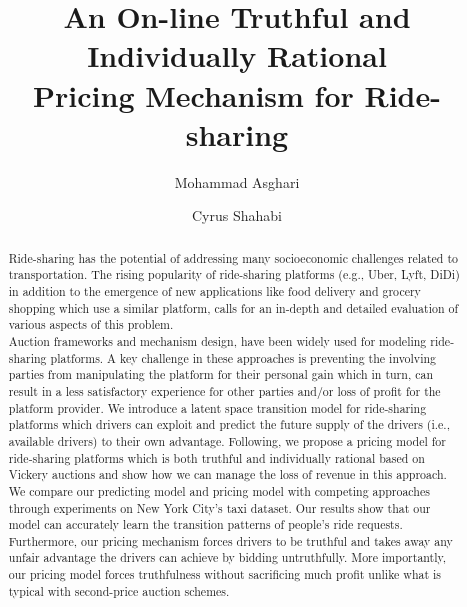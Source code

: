 \documentclass[sigconf]{acmart}
\begin{document}
\title{An On-line Truthful and Individually Rational\\Pricing Mechanism for Ride-sharing}
\author{Mohammad Asghari}
\author{Cyrus Shahabi}

\begin{abstract}
Ride-sharing has the potential of addressing many socioeconomic challenges related to transportation. The rising popularity of ride-sharing platforms (e.g., Uber, Lyft, DiDi) in addition to the emergence of new applications like food delivery and grocery shopping which use a similar platform,  calls for an in-depth and detailed evaluation of various aspects of this problem.\\
Auction frameworks and mechanism design, have been widely used for modeling ride-sharing platforms. A key challenge in these approaches is preventing the involving parties from manipulating the platform for their personal gain which in turn, can result in a less satisfactory experience for other parties and/or loss of profit for the platform provider. We introduce a latent space transition model for ride-sharing platforms which drivers can exploit and predict the future supply of the drivers (i.e., available drivers) to their own advantage. Following, we propose a pricing model for ride-sharing platforms which is both truthful and individually rational based on Vickery auctions and show how we can manage the loss of revenue in this approach. We compare our predicting model and pricing model with competing approaches through experiments on New York City's taxi dataset. Our results show that our model can accurately learn the transition patterns of people's ride requests. Furthermore, our pricing mechanism forces drivers to be truthful and takes away any unfair advantage the drivers can achieve by bidding untruthfully. More importantly, our pricing model forces truthfulness without sacrificing much profit unlike what is typical with second-price auction schemes.
\end{abstract}

\maketitle
\end{document}
